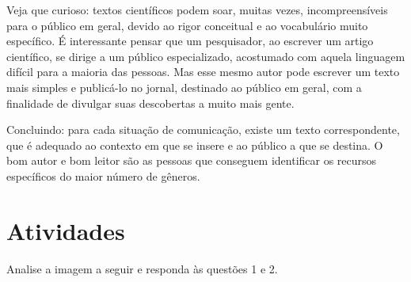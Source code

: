 {Veja que curioso: textos científicos podem soar, muitas vezes,
incompreensíveis para o público em geral, devido ao rigor conceitual e ao
vocabulário muito específico. É interessante pensar que um pesquisador, ao
escrever um artigo científico, se dirige a um público especializado,
acostumado com aquela linguagem difícil para a maioria das pessoas. Mas esse
mesmo autor pode escrever um texto mais simples e publicá-lo no jornal,
destinado ao público em geral, com a finalidade de divulgar suas descobertas a
muito mais gente.

Concluindo: para cada situação de comunicação, existe um texto correspondente,
que é adequado ao contexto em que se insere e ao público a que se destina. O
bom autor e bom leitor são as pessoas que conseguem identificar os recursos
específicos do maior número de gêneros.}





\section{Atividades}

Analise a imagem a seguir e responda às questões 1 e 2. 

